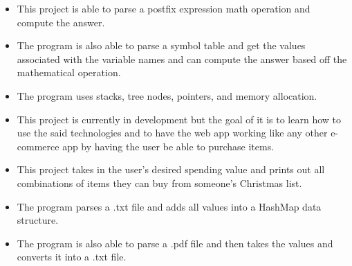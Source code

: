 \documentclass[10pt,a4paper,ragged2e]{altacv}
\begin{document}
\begin{itemize}
    \item This project is able to parse a postfix expression math operation and compute the answer.
    \item The program is also able to parse a symbol table and get the values associated with the variable names and can compute the answer based off the mathematical operation.
    \item The program uses stacks, tree nodes, pointers, and memory allocation.
\end{itemize}
\divider

\begin{itemize}
    \item This project is currently in development but the goal of it is to learn how to use the said technologies and to have the web app working 
    like any other e-commerce app by having the user be able to purchase items.
\end{itemize}
\divider

\begin{itemize}
\item This project takes in the user's desired spending value and prints out all combinations of items they can buy from someone's Christmas list.
\item The program parses a .txt file and adds all values into a HashMap data structure.
\item The program is also able to parse a .pdf file and then takes the values and converts it into a .txt file.
\end{itemize}






\end{document}
